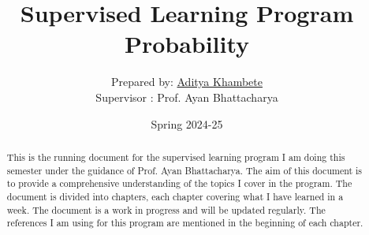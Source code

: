 \documentclass{report}
\title{Supervised Learning Program \\ Probability}
\author{Prepared by: \href{https://adityak1729.github.io}{Aditya Khambete} \\
Supervisor : Prof. Ayan Bhattacharya}
\date{Spring 2024-25}
\theoremstyle{definition} %
\theoremstyle{remark} %
\begin{document}
\maketitle
\tableofcontents
\begin{abstract}
    This is the running document for the supervised learning program I am doing this semester under the guidance of Prof. Ayan Bhattacharya. The aim of this document is to provide a comprehensive understanding of the topics I cover in the program. The document is divided into chapters, each chapter covering what I have learned in a week. The document is a work in progress and will be updated regularly.
    The references I am using for this program are mentioned in the beginning of each chapter.
\end{abstract}

% 
% 


\end{document}

